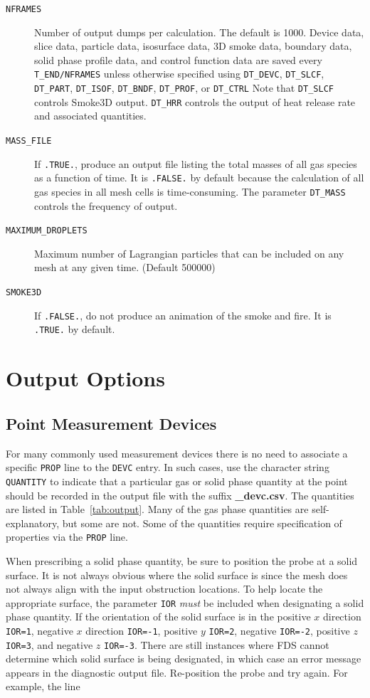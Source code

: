 \documentclass[11pt]{book}
\newcommand{\ct}{\tt\small}
\begin{document}
\begin{description}
\item[{\ct NFRAMES}] Number of output dumps per calculation. The default is 1000.
Device data, slice data, particle data, isosurface data, 3D smoke data, boundary data, solid phase profile data, and
control function data are saved every {\ct T\_END/NFRAMES} unless otherwise specified
using {\ct DT\_DEVC}, {\ct DT\_SLCF}, {\ct DT\_PART}, {\ct DT\_ISOF}, {\ct DT\_BNDF}, {\ct DT\_PROF},
or {\ct DT\_CTRL} Note that {\ct DT\_SLCF} controls Smoke3D output. {\ct DT\_HRR} controls the
output of heat release rate and associated quantities.
\item[{\ct MASS\_FILE}] If {\ct .TRUE.}, produce an output file listing the total masses of all gas species as a function of time. It is {\ct .FALSE.} by default because the calculation
of all gas species in all mesh cells is time-consuming. The parameter {\ct DT\_MASS} controls the frequency of output.
\item[{\ct MAXIMUM\_DROPLETS}] Maximum number of Lagrangian particles that can be included on any
mesh at any given time. (Default 500000)
\item[{\ct SMOKE3D}] If {\ct .FALSE.}, do not produce an animation of the smoke and fire. It is {\ct .TRUE.} by default.
\end{description}


\section{Output Options}

\subsection{Point Measurement Devices}
For many commonly used measurement devices there is no need to associate a
specific {\ct PROP} line to the {\ct DEVC} entry. In such cases, use the character string
{\ct QUANTITY} to indicate that a particular gas or solid phase quantity at the point should be recorded in
the output file with the suffix {\bf \_devc.csv}. The quantities are listed in Table~\ref{tab:output}.
Many of the gas phase quantities are self-explanatory, but some are not. Some of the quantities require specification of
properties via the {\ct PROP} line.

When prescribing a solid phase quantity, be sure to position the
probe at a solid surface. It is not always obvious where the
solid surface is since the mesh does not always align with the input obstruction
locations. To help locate the appropriate surface, the parameter {\ct IOR} {\em must} be included
when designating a solid phase quantity.
If the orientation of the solid surface is in the
positive $x$ direction {\ct IOR=1}, negative $x$ direction {\ct IOR=-1},
positive $y$ {\ct IOR=2}, negative {\ct IOR=-2}, positive $z$ {\ct IOR=3},
and negative $z$ {\ct IOR=-3}. There are still instances where FDS cannot
determine which solid surface is being designated, in which case an
error message appears in the diagnostic output file.
Re-position the probe and try again. For example, the line
\end{document}
